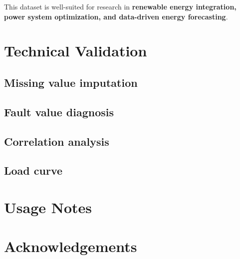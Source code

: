 \documentclass[12pt]{article}
\begin{document}
This dataset is well-suited for research in \textbf{renewable energy integration, power system optimization, and data-driven energy forecasting}.


\section*{Technical Validation}
\subsection*{Missing value imputation}

\subsection*{Fault value diagnosis}

\subsection*{Correlation analysis}
\subsection*{Load curve}

\section*{Usage Notes}

\section*{Acknowledgements}

\end{document}
